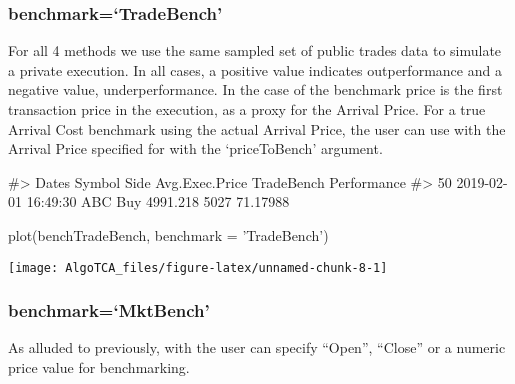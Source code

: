 \hypertarget{benchmarktradebench}{%
\subsubsection{benchmark=`TradeBench'}\label{benchmarktradebench}}

For all 4 methods we use the same sampled set of public trades data to
simulate a private execution. In all cases, a positive value indicates
outperformance and a negative value, underperformance. In the case of
 the benchmark price is the first
transaction price in the execution, as a proxy for the Arrival Price.
For a true Arrival Cost benchmark using the actual Arrival Price, the
user can use  with the Arrival Price
specified for with the `priceToBench' argument.

\begin{Schunk}
\begin{Soutput}
#>                  Dates Symbol Side Avg.Exec.Price TradeBench Performance
#> 50 2019-02-01 16:49:30    ABC  Buy       4991.218       5027    71.17988
\end{Soutput}
\begin{Sinput}
plot(benchTradeBench, benchmark = 'TradeBench')
\end{Sinput}


\begin{center}\texttt{[image: AlgoTCA\_files/figure-latex/unnamed-chunk-8-1]} \end{center}

\end{Schunk}

\hypertarget{benchmarkmktbench}{%
\subsubsection{benchmark=`MktBench'}\label{benchmarkmktbench}}

As alluded to previously, with  the user can
specify ``Open'', ``Close'' or a numeric price value for benchmarking.

